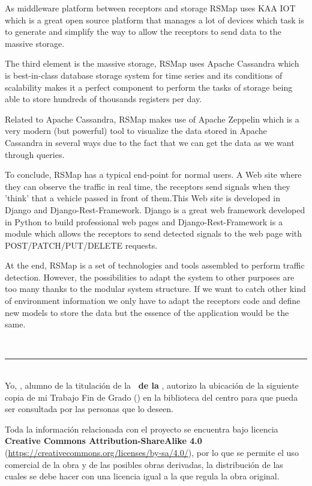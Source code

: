 {{As middleware platform between receptors and storage RSMap uses KAA IOT which is a great open source platform that manages a lot of devices which task is to generate and simplify the way to allow the receptors to send data to the massive storage.

The third element is the massive storage, RSMap uses Apache Cassandra which is best-in-class database storage system for time series and its conditions of scalability makes it a perfect component to perform the tasks of storage being able to store hundreds of thousands registers per day.

Related to Apache Cassandra, RSMap makes use of Apache Zeppelin which is a very modern (but powerful) tool to visualize the data stored in Apache Cassandra in several ways due to the fact that we can get the data as we want through queries.

To conclude, RSMap has a typical end-point for normal users. A Web site where they can observe the traffic in real time, the receptors send signals when they 'think' that a vehicle passed in front of them.This Web site is developed in Django and Django-Rest-Framework. Django is a great web framework developed in Python to build professional web pages and Django-Rest-Framework is a module which allows the receptors to send detected signals to the web page with POST/PATCH/PUT/DELETE requests.


\bigskip
At the end, RSMap is a set of technologies and tools assembled to perform traffic detection. However, the possibilities to adapt the system to other purposes are too many thanks to the modular system structure. If we want to catch other kind of environment information we only have to adapt the receptors code and define new models to store the data but the essence of the application would be the same.

\newpage
\thispagestyle{empty}
\
\vspace{3cm}

\noindent\rule[-1ex]{\textwidth}{2pt}\\[4.5ex]

Yo, \textbf{\autor}, alumno de la titulación \textbf{\grado} de la \textbf{\escuela\ de la \universidad}, autorizo la ubicación de la siguiente copia de mi Trabajo Fin de Grado (\textit{\titulo}) en la biblioteca del centro para que pueda ser consultada por las personas que lo deseen.

\bigskip
Toda la información relacionada con el proyecto se encuentra bajo licencia \textbf{Creative Commons Attribution-ShareAlike 4.0} (\url{https://creativecommons.org/licenses/by-sa/4.0/}), por lo que se permite el uso comercial de la obra y de las posibles obras derivadas, la distribución de las cuales se debe hacer con una licencia igual a la que regula la obra original.

}}
